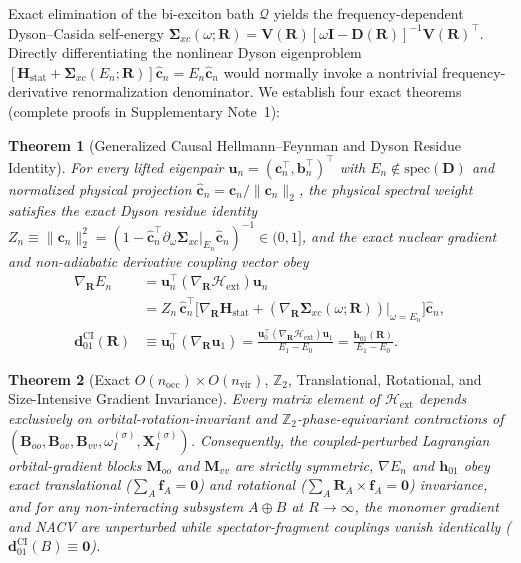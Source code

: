 \documentclass[10pt,twocolumn]{article}
\theoremstyle{natthm}
\newtheorem{theorem}{Theorem}
\newcommand{\Hext}{\mathcal{H}_{\mathrm{ext}}}
\newcommand{\Sig}{\mathbf{\Sigma}_{xc}}
\newcommand{\dCI}{\mathbf{d}_{01}^{\mathrm{CI}}}
\newcommand{\hCI}{\mathbf{h}_{01}}
\begin{document}
Exact elimination of the bi-exciton bath $\mathcal{Q}$ yields the frequency-dependent Dyson--Casida self-energy $\Sig(\omega;\mathbf{R})=\mathbf{V}(\mathbf{R})[\omega\mathbf{I}-\mathbf{D}(\mathbf{R})]^{-1}\mathbf{V}(\mathbf{R})^\top$.
Directly differentiating the nonlinear Dyson eigenproblem $[\mathbf{H}_{\mathrm{stat}}+\Sig(E_n;\mathbf{R})]\hat{\mathbf{c}}_n=E_n\hat{\mathbf{c}}_n$ would normally invoke a nontrivial frequency-derivative renormalization denominator.
We establish four exact theorems (complete proofs in Supplementary Note~1):

\begin{theorem}[Generalized Causal Hellmann--Feynman and Dyson Residue Identity]
For every lifted eigenpair $\mathbf{u}_n=(\mathbf{c}_n^\top,\mathbf{b}_n^\top)^\top$ with $E_n\notin\mathrm{spec}(\mathbf{D})$ and normalized physical projection $\hat{\mathbf{c}}_n=\mathbf{c}_n/\|\mathbf{c}_n\|_2$, the physical spectral weight satisfies the exact Dyson residue identity $Z_n\equiv\|\mathbf{c}_n\|_2^2=(1-\hat{\mathbf{c}}_n^\top\partial_\omega\Sig|_{E_n}\hat{\mathbf{c}}_n)^{-1}\in(0,1]$, and the exact nuclear gradient and non-adiabatic derivative coupling vector obey
\begin{align}
  \nabla_{\mathbf{R}} E_n
  &= \mathbf{u}_n^\top(\nabla_{\mathbf{R}}\Hext)\mathbf{u}_n \nonumber \\
  &= Z_n\,\hat{\mathbf{c}}_n^\top\bigl[\nabla_{\mathbf{R}}\mathbf{H}_{\mathrm{stat}} + (\nabla_{\mathbf{R}}\Sig(\omega;\mathbf{R}))|_{\omega=E_n}\bigr]\hat{\mathbf{c}}_n, \label{eq:thm1_grad}\\
  \dCI(\mathbf{R})
  &\equiv \mathbf{u}_0^\top(\nabla_{\mathbf{R}}\mathbf{u}_1)
   = \frac{\mathbf{u}_0^\top(\nabla_{\mathbf{R}}\Hext)\mathbf{u}_1}{E_1-E_0}
   = \frac{\hCI(\mathbf{R})}{E_1-E_0}. \label{eq:thm1_nacv}
\end{align}
\end{theorem}

\begin{theorem}[Exact $O(n_{\mathrm{occ}})\times O(n_{\mathrm{vir}})$, $\mathbb{Z}_2$, Translational, Rotational, and Size-Intensive Gradient Invariance]
Every matrix element of $\Hext$ depends exclusively on orbital-rotation-invariant and $\mathbb{Z}_2$-phase-equivariant contractions of $(\mathbf{B}_{oo},\mathbf{B}_{ov},\mathbf{B}_{vv},\omega_I^{(\sigma)},\mathbf{X}_I^{(\sigma)})$. Consequently, the coupled-perturbed Lagrangian orbital-gradient blocks $\mathbf{M}_{oo}$ and $\mathbf{M}_{vv}$ are strictly symmetric, $\nabla E_n$ and $\hCI$ obey exact translational ($\sum_A\mathbf{f}_A=\mathbf{0}$) and rotational ($\sum_A\mathbf{R}_A\times\mathbf{f}_A=\mathbf{0}$) invariance, and for any non-interacting subsystem $A\oplus B$ at $R\to\infty$, the monomer gradient and NACV are unperturbed while spectator-fragment couplings vanish identically ($\dCI(B)\equiv\mathbf{0}$).
\end{theorem}
\end{document}
